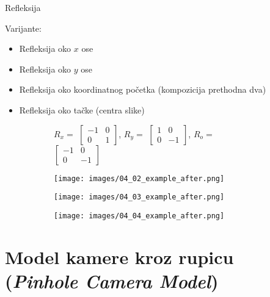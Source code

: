 \documentclass[bookmarks=true,bookmarksopen=true,pdfborder={0 0 0},pdfhighlight={/N},linkbordercolor={.5 .5 .5},implicit=false,unicode,xcolor={table}]{beamer}
\begin{document}
\begin{frame}{Refleksija}

  Varijante:
  \begin{itemize}
    \item Refleksija oko $x$ ose
    \item Refleksija oko $y$ ose
    \item Refleksija oko koordinatnog početka (kompozicija prethodna dva)
    \item Refleksija oko tačke (centra slike)
  \end{itemize}
  \begin{figure}
    \begin{subfigure}{9cm}
      $R_{x} =$
      $\begin{bmatrix}
        -1 & 0\\
        0 & 1
      \end{bmatrix}$,
      \hfill
      $R_{y} =$
      $\begin{bmatrix}
        1 & 0\\
        0 & -1
      \end{bmatrix}$,
      \hfill
      $R_{o} =$
      $\begin{bmatrix}
          -1 & 0\\
          0 & -1
      \end{bmatrix}$
    \end{subfigure}
  \end{figure}
  
  \begin{figure}
    \begin{subfigure}{3cm}
      \texttt{[image: images/04\_02\_example\_after.png]}
    \end{subfigure}
    \begin{subfigure}{3cm}
      \texttt{[image: images/04\_03\_example\_after.png]}
    \end{subfigure}
    \begin{subfigure}{3cm}
      \texttt{[image: images/04\_04\_example\_after.png]}
    \end{subfigure}
  \end{figure}

\end{frame}

\section{Model kamere kroz rupicu\\(\textit{Pinhole Camera Model})}
\end{document}
